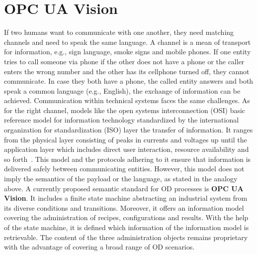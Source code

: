 \section{OPC UA Vision}

If two humans want to communicate with one another, they need matching channels and need to speak the same language. A channel is a mean of transport for information, e.g., sign language, smoke signs and mobile phones. If one entity tries to call someone via phone if the other does not have a phone or the caller enters the wrong number and the other has its cellphone turned off, they cannot communicate. In case they both have a phone, the called entity answers and both speak a common language (e.g., English), the exchange of information can be achieved. Communication within technical systems faces the same challenges. As for the right channel, models like the open systems interconnection (OSI) basic reference model for information technology standardized by the international organization for standardization (ISO) layer the transfer of information. It ranges from the physical layer consisting of peaks in currents and voltages up until the application layer which includes direct user interaction, resource availability and so forth~\cite{InternationalOrganizationForStandardization1996ISO/IECEd.}. This model and the protocols adhering to it ensure that information is delivered safely between communicating entities. However, this model does not imply the semantics of the payload or the language, as stated in the analogy above. A currently proposed semantic standard for OD processes is \textbf{OPC UA Vision}. It includes a finite state machine abstracting an industrial system from its diverse conditions and transitions. Moreover, it offers an information model covering the administration of recipes, configurations and results. With the help of the state machine, it is defined which information of the information model is retrievable. The content of the three administration objects remains proprietary with the advantage of covering a broad range of OD scenarios.


